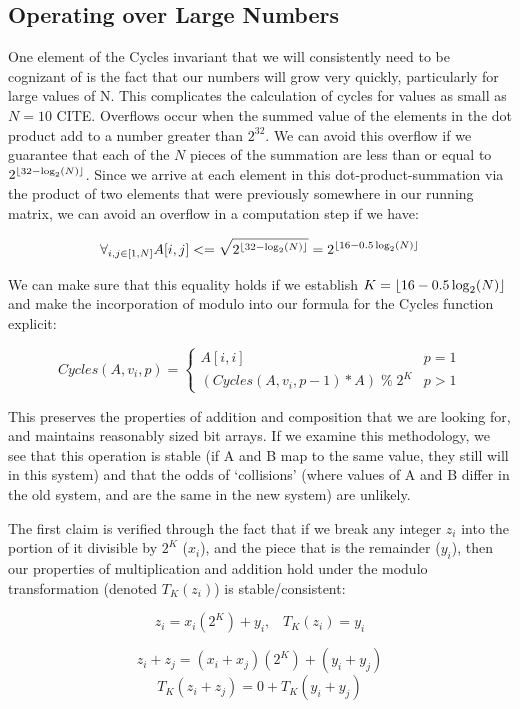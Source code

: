 \documentclass[11pt,a4paper]{report}
\DeclarePairedDelimiter\floor{\lfloor}{\rfloor}
\begin{document}
\subsection{Operating over Large Numbers}
One element of the Cycles invariant that we will consistently need to be cognizant of is the fact that our numbers will grow very quickly, particularly for large values of N.
This complicates the calculation of cycles for values as small as $N=10$ CITE.
Overflows occur when the summed value of the elements in the dot product add to a number greater than $2^32$.
We can avoid this overflow if we guarantee that each of the $N$ pieces of the summation are less than or equal to $2^{\floor{32 - \log_2(N)}}$.
Since we arrive at each element in this dot-product-summation via the product of two elements that were previously somewhere in our running matrix, we can avoid an overflow in a computation step if we have:

$$ \forall_{i, j \in [1, N]} A[i, j] <= \sqrt{2^{\floor{32 - \log_2(N)}}} = 2^{\floor{16 - 0.5\log_2(N)}}$$

We can make sure that this equality holds if we establish $K = \floor{16 - 0.5\log_2(N)}$ and make the incorporation of modulo into our formula for the Cycles function explicit:

$$ Cycles(A, v_i, p) = \begin{cases} 
      A[i,i] & p = 1 \\
      (Cycles(A, v_i, p-1) * A) \; \% \; 2^K  & p > 1
\end{cases}$$

This preserves the properties of addition and composition that we are looking for, and maintains reasonably sized bit arrays.
If we examine this methodology, we see that this operation is stable (if A and B map to the same value, they still will in this system) and that the odds of `collisions' (where values of A and B differ in the old system, and are the same in the new system) are unlikely.

The first claim is verified through the fact that if we break any integer $z_i$ into the portion of it divisible by $2^K$ ($x_i$), and the piece that is the remainder ($y_i$), then our properties of multiplication and addition hold under the modulo transformation (denoted $T_K(z_i)$) is stable/consistent:

$$z_i =  x_i(2^K) + y_i , \;\;\;T_K(z_i) = y_i$$

$$z_i + z_j = (x_i + x_j)(2^K) + (y_i + y_j)$$
$$T_K(z_i + z_j) = 0 + T_K(y_i + y_j)$$
\end{document}
